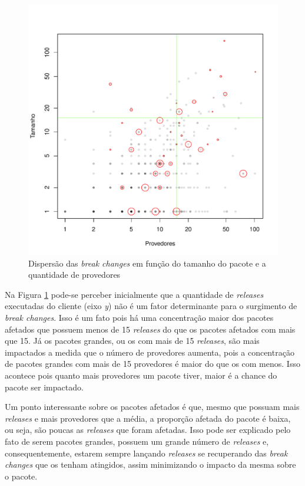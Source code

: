 \begin{figure}
    \centering
    \includegraphics[scale=0.5]{figuras/result_rq1_releases_affecteds.pdf}
    \caption{Dispersão das \textit{break changes} em função do tamanho do pacote e a quantidade de provedores}
    \label{fig:result_rq1_releases_affecteds}
\end{figure}{}

Na Figura \ref{fig:result_rq1_releases_affecteds} pode-se perceber inicialmente que a quantidade de \textit{releases} executadas do cliente (eixo \textit{y}) não é um fator determinante para o surgimento de \textit{break changes}. Isso é um fato pois há uma concentração maior dos pacotes afetados que possuem menos de 15 \textit{releases} do que os pacotes afetados com mais que 15. Já os pacotes grandes, ou os com mais de 15 \textit{releases}, são mais impactados a medida que o número de provedores aumenta, pois a concentração de pacotes grandes com mais de 15 provedores é maior do que os com menos. Isso acontece pois quanto mais provedores um pacote tiver, maior é a chance do pacote ser impactado.

Um ponto interessante sobre os pacotes afetados é que, mesmo que possuam mais \textit{releases} e mais provedores que a média, a proporção afetada do pacote é baixa, ou seja, são poucas as \textit{releases} que foram afetadas. Isso pode ser explicado pelo fato de serem pacotes grandes, possuem um grande número de \textit{releases} e, consequentemente, estarem sempre lançando \textit{releases} se recuperando das \textit{break changes} que os tenham atingidos, assim minimizando o impacto da mesma sobre o pacote.

